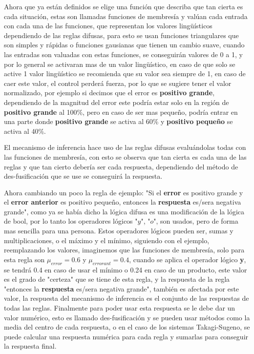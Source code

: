Ahora que ya están definidos se elige una función que describa que tan cierta es cada situación, estas son llamadas funciones de membresía y valúan cada entrada con cada una de las funciones, que representan los valores lingüísticos dependiendo de las reglas difusas, para esto se usan funciones triangulares que son simples y rápidas o funciones gausianas que tienen un cambio suave, cuando las entradas son valuadas con estas funciones, se conseguirán valores de 0 a 1, y por lo general se activaran mas de un valor lingüístico, en caso de que solo se active 1 valor lingüístico se recomienda que su valor sea siempre de 1, en caso de caer este valor, el control perderá fuerza, por lo que se sugiere tener el valor normalizado, por ejemplo si decimos que el error es \textbf{positivo grande}, dependiendo de la magnitud del error este podría estar solo en la región de \textbf{positivo grande} al 100\%, pero en caso de ser mas pequeño, podría entrar en una parte donde \textbf{positivo grande} se activa al 60\% y \textbf{positivo pequeño} se activa al 40\%.

El mecanismo de inferencia hace uso de las reglas difusas evaluándolas todas con las funciones de membresía, con esto se observa que tan cierta es cada una de las reglas y que tan cierto debería ser cada respuesta, dependiendo del método de des-fusificación que se use se conseguirá la respuesta.

Ahora cambiando un poco la regla de ejemplo: "Si el \textbf{error} es positivo grande y el \textbf{error anterior} es positivo pequeño, entonces la \textbf{respuesta} es/sera negativa grande", como ya se había dicho la lógica difusa es una modificación de la lógica de bool, por lo tanto los operadores lógicos "$y$", "$o$", son usados, pero de forma mas sencilla para una persona. Estos operadores lógicos pueden ser, sumas y multiplicaciones, o el máximo y el mínimo, siguiendo con el ejemplo, reemplazando los valores, imaginemos que las funciones de membresía, solo para esta regla son $\mu_{error}=0.6$ y $\mu_{errorant}=0.4$, cuando se aplica el operador lógico \textbf{y}, se tendrá 0.4 en caso de usar el mínimo o 0.24 en caso de un producto, este valor es el grado de "certeza" que se tiene de esta regla, y la respuesta de la regla "entonces la \textbf{respuesta} es/sera negativa grande", también es afectada por este valor, la respuesta del mecanismo de inferencia es el conjunto de las  respuestas de todas las reglas.
Finalmente para poder usar esta respuesta se le debe dar un valor numérico, esto es llamado des-fusificación y se pueden usar métodos como la media del centro de cada respuesta, o en el caso de los sistemas Takagi-Sugeno, se puede calcular una respuesta numérica para cada regla y sumarlas para conseguir la respuesta final.


